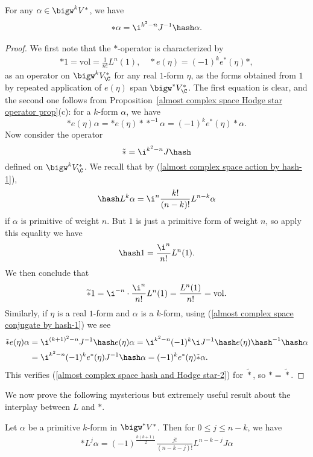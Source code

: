 \begin{lemma}\label{almost complex space hash and Hodge star}
For any $\alpha\in\bigw^kV^*$, we have
\begin{align}\label{almost complex space hash and Hodge star-1}
\ast\alpha=\i^{k^2-n}J^{-1}\hash\alpha.
\end{align}
\end{lemma}
\begin{proof}
We first note that the $\ast$-operator is characterized by
\begin{align}\label{almost complex space hash and Hodge star-2}
\ast 1=\mathrm{vol}=\frac{1}{n!}L^n(1),\quad  \ast e(\eta)=(-1)^ke^*(\eta)\ast,
\end{align}
as an operator on $\bigw^kV^*_{\C}$ for any real $1$-form $\eta$, as the forms obtained from $1$ by repeated application of $e(\eta)$ span $\bigw^*V^*_{\C}$. The first equation is clear, and the second one follows from Proposition~\ref{almost complex space Hodge star operator prop}(c): for a $k$-form $\alpha$, we have
\[\ast e(\eta)\alpha=\ast e(\eta)\ast\ast^{-1}\alpha=(-1)^ke^*(\eta)\ast\alpha.\]
Now consider the operator
\[\tilde{\ast}=\i^{k^2-n}J\hash\]
defined on $\bigw^kV^*_{\C}$. We recall that by (\ref{almost complex space action by hash-1}),
\[\hash L^k\alpha=\i^n\frac{k!}{(n-k)!}L^{n-k}\alpha\]
if $\alpha$ is primitive of weight $n$. But $1$ is just a primitive form of weight $n$, so apply this equality we have
\[\hash 1=\frac{\i^n}{n!}L^{n}(1).\]
We then conclude that
\[\widetilde{\ast}1=\i^{-n}\cdot\frac{\i^n}{n!}L^n(1)=\frac{L^n(1)}{n!}=\mathrm{vol}.\]
Similarly, if $\eta$ is a real $1$-form and $\alpha$ is a $k$-form, using (\ref{almost complex space conjugate by hash-1}) we see 
\begin{align*}
\tilde{\ast}e(\eta)\alpha&=\i^{(k+1)^2-n}J^{-1}\hash e(\eta)\alpha=\i^{k^2-n}(-1)^k\i J^{-1}\hash e(\eta)\hash^{-1}\hash\alpha\\
&=\i^{k^2-n}(-1)^ke^*(\eta)J^{-1}\hash\alpha=(-1)^ke^*(\eta)\tilde{\ast}\alpha.
\end{align*}
This verifies (\ref{almost complex space hash and Hodge star-2}) for $\tilde{\ast}$, so $\ast=\tilde{\ast}$.
\end{proof}
We now prove the following mysterious but extremely useful result about the interplay between $L$ and $\ast$.
\begin{proposition}\label{almost complex space star and L power}
Let $\alpha$ be a primitive $k$-form in $\bigw^*V^*$. Then for $0\leq j\leq n-k$, we have
\begin{align}
\ast L^j\alpha=(-1)^{\frac{k(k+1)}{2}}\frac{j!}{(n-k-j)!}L^{n-k-j}J\alpha
\end{align}
\end{proposition}
